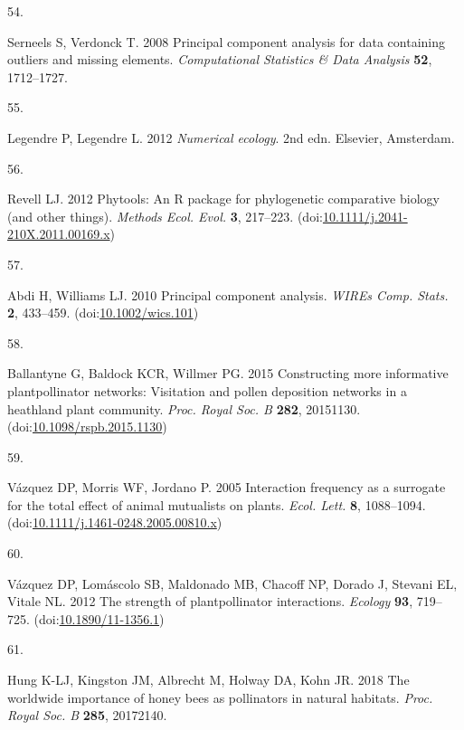 \documentclass[
  12pt,
  a4paper,
]{article}
\newlength{\cslhangindent}
\newlength{\csllabelwidth}
\newlength{\cslentryspacingunit} %
\newenvironment{CSLReferences}[2] %
 {%
  \setlength{\parindent}{0pt}
  \ifodd #1
  \let\oldpar\par
  \def\par{\hangindent=\cslhangindent\oldpar}
  \fi
  \setlength{\parskip}{#2\cslentryspacingunit}
 }%
 {}
\newcommand{\CSLLeftMargin}[1]{\parbox[t]{\csllabelwidth}{#1}}
\newcommand{\CSLRightInline}[1]{\parbox[t]{\linewidth - \csllabelwidth}{#1}\break}
\begin{document}
\begin{CSLReferences}{0}{0}
\leavevmode{}%
\CSLLeftMargin{54. }
\CSLRightInline{Serneels S, Verdonck T. 2008 Principal component analysis for data containing outliers and missing elements. \emph{Computational Statistics \& Data Analysis} \textbf{52}, 1712--1727.}

\leavevmode{}%
\CSLLeftMargin{55. }
\CSLRightInline{Legendre P, Legendre L. 2012 \emph{Numerical ecology}. {2nd edn}. {Elsevier, Amsterdam}. }

\leavevmode{}%
\CSLLeftMargin{56. }
\CSLRightInline{Revell LJ. 2012 Phytools: An {R} package for phylogenetic comparative biology (and other things). \emph{Methods Ecol. Evol.} \textbf{3}, 217--223. (doi:\href{https://doi.org/10.1111/j.2041-210X.2011.00169.x}{10.1111/j.2041-210X.2011.00169.x})}

\leavevmode{}%
\CSLLeftMargin{57. }
\CSLRightInline{Abdi H, Williams LJ. 2010 Principal component analysis. \emph{WIREs Comp. Stats.} \textbf{2}, 433--459. (doi:\href{https://doi.org/10.1002/wics.101}{10.1002/wics.101})}

\leavevmode{}%
\CSLLeftMargin{58. }
\CSLRightInline{Ballantyne G, Baldock KCR, Willmer PG. 2015 Constructing more informative plant\textendash pollinator networks: Visitation and pollen deposition networks in a heathland plant community. \emph{Proc. Royal Soc. B} \textbf{282}, 20151130. (doi:\href{https://doi.org/10.1098/rspb.2015.1130}{10.1098/rspb.2015.1130})}

\leavevmode{}%
\CSLLeftMargin{59. }
\CSLRightInline{Vázquez DP, Morris WF, Jordano P. 2005 Interaction frequency as a surrogate for the total effect of animal mutualists on plants. \emph{Ecol. Lett.} \textbf{8}, 1088--1094. (doi:\href{https://doi.org/10.1111/j.1461-0248.2005.00810.x}{10.1111/j.1461-0248.2005.00810.x})}

\leavevmode{}%
\CSLLeftMargin{60. }
\CSLRightInline{Vázquez DP, Lomáscolo SB, Maldonado MB, Chacoff NP, Dorado J, Stevani EL, Vitale NL. 2012 The strength of plant\textendash pollinator interactions. \emph{Ecology} \textbf{93}, 719--725. (doi:\href{https://doi.org/10.1890/11-1356.1}{10.1890/11-1356.1})}

\leavevmode{}%
\CSLLeftMargin{61. }
\CSLRightInline{Hung K-LJ, Kingston JM, Albrecht M, Holway DA, Kohn JR. 2018 The worldwide importance of honey bees as pollinators in natural habitats. \emph{Proc. Royal Soc. B} \textbf{285}, 20172140.}


\end{CSLReferences}
\end{document}
